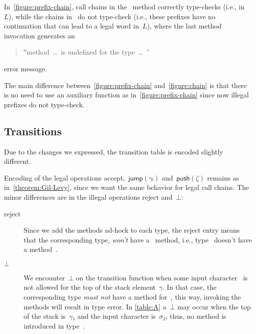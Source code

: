 \begin{figure*}
  \caption{\label{figure:prefix-chain} Accepting and non-accepting call chains with the
  type encoding of jDPDA~$A$ (as defined in \cref{table:A}).
  All lines in  type-check, and all lines in 
  cause type errors}
\end{figure*}

In~\cref{figure:prefix-chain}, call chains in the~ method
  correctly type-checks (i.e., in~$L$), while the chains in~
  do not type-check (i.e., these prefixes have no continuation that can lead to a legal word in~$L$),
  where the last method invocation generates an
\begin{quote}
  ‟\textsf{method~…~is undefined for the type~…~}”
\end{quote}
  error message.

The main difference between~\cref{figure:prefix-chain} and~\cref{figure:chain} is that there is no need to
  use an auxiliary function  as in~\cref{figure:prefix-chain} since now illegal
  prefixes do not type-check.

\subsection{Transitions}
Due to the changes we expressed, the transition table is encoded slightly different.

Encoding of the legal operations \textsf{accept},~$\textsf{jump}(γᵢ)$ and~$\textsf{push}(ζ)$
  remains as in~\cref{theorem:Gil-Levy}, since we want the same behavior for legal call chains.
The minor differences are in the illegal operations \textsf{reject} and~$⊥$:

\begin{description}
 \item[\textsf{reject}] Since we add the methods ad-hock to each type, the reject entry means
   that the corresponding type, \emph{won't} have a~\cc{\$()} method, i.e., type~
   doesn't have a method~\cc{\$()}.
 \item[$⊥$] We encounter~$⊥$ on the transition function when some input character~
   is not allowed for the top of the stack element~$γ$. In that case, the corresponding type 
   \emph{must not} have a method for~, this way, invoking the methods will result in type error.
   In \cref{table:A} a~$⊥$ may occur when the top of the stack is~$γ₁$ and the input character is~$σ₂$,
   thus, no method  is introduced in type~.
\end{description}

